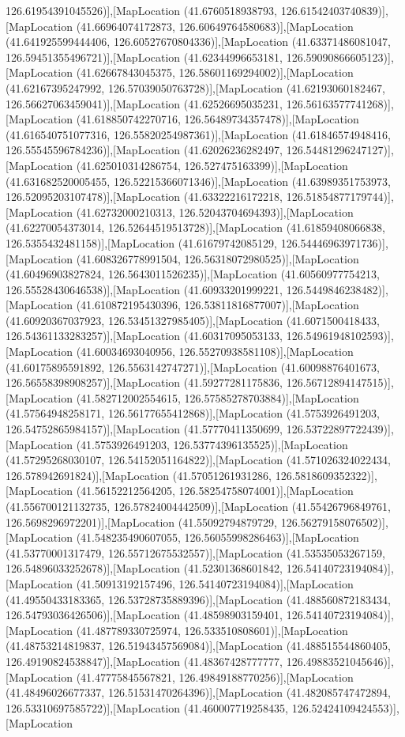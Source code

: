 126.61954391045526)],[MapLocation (41.6760518938793, 126.61542403740839)],[MapLocation (41.66964074172873, 126.60649764580683)],[MapLocation (41.641925599444406, 126.60527670804336)],[MapLocation (41.63371486081047, 126.59451355496721)],[MapLocation (41.62344996653181, 126.59090866605123)],[MapLocation (41.62667843045375, 126.58601169294002)],[MapLocation (41.62167395247992, 126.57039050763728)],[MapLocation (41.62193060182467, 126.56627063459041)],[MapLocation (41.62526695035231, 126.56163577741268)],[MapLocation (41.618850742270716, 126.56489734357478)],[MapLocation (41.616540751077316, 126.55820254987361)],[MapLocation (41.61846574948416, 126.55545596784236)],[MapLocation (41.62026236282497, 126.54481296247127)],[MapLocation (41.625010314286754, 126.527475163399)],[MapLocation (41.631682520005455, 126.52215366071346)],[MapLocation (41.63989351753973, 126.52095203107478)],[MapLocation (41.63322216172218, 126.51854877179744)],[MapLocation (41.62732000210313, 126.52043704694393)],[MapLocation (41.62270054373014, 126.52644519513728)],[MapLocation (41.61859408066838, 126.5355432481158)],[MapLocation (41.61679742085129, 126.54446963971736)],[MapLocation (41.608326778991504, 126.56318072980525)],[MapLocation (41.60496903827824, 126.5643011526235)],[MapLocation (41.60560977754213, 126.55528430646538)],[MapLocation (41.60933201999221, 126.5449846238482)],[MapLocation (41.610872195430396, 126.53811816877007)],[MapLocation (41.60920367037923, 126.53451327985405)],[MapLocation (41.6071500418433, 126.54361133283257)],[MapLocation (41.60317095053133, 126.54961948102593)],[MapLocation (41.60034693040956, 126.55270938581108)],[MapLocation (41.60175895591892, 126.5563142747271)],[MapLocation (41.60098876401673, 126.56558398908257)],[MapLocation (41.59277281175836, 126.56712894147515)],[MapLocation (41.582712002554615, 126.57585278703884)],[MapLocation (41.57564948258171, 126.56177655412868)],[MapLocation (41.5753926491203, 126.54752865984157)],[MapLocation (41.57770411350699, 126.53722897722439)],[MapLocation (41.5753926491203, 126.53774396135525)],[MapLocation (41.57295268030107, 126.54152051164822)],[MapLocation (41.571026324022434, 126.578942691824)],[MapLocation (41.57051261931286, 126.5818609352322)],[MapLocation (41.56152212564205, 126.58254758074001)],[MapLocation (41.556700121132735, 126.57824004442509)],[MapLocation (41.55426796849761, 126.5698296972201)],[MapLocation (41.55092794879729, 126.56279158076502)],[MapLocation (41.548235490607055, 126.56055998286463)],[MapLocation (41.53770001317479, 126.55712675532557)],[MapLocation (41.53535053267159, 126.54896033252678)],[MapLocation (41.52301368601842, 126.54140723194084)],[MapLocation (41.50913192157496, 126.54140723194084)],[MapLocation (41.49550433183365, 126.53728735889396)],[MapLocation (41.488560872183434, 126.54793036426506)],[MapLocation (41.48598903159401, 126.54140723194084)],[MapLocation (41.487789330725974, 126.533510808601)],[MapLocation (41.48753214819837, 126.51943457569084)],[MapLocation (41.488515544860405, 126.49190824538847)],[MapLocation (41.48367428777777, 126.49883521045646)],[MapLocation (41.47775845567821, 126.49849188770256)],[MapLocation (41.48496026677337, 126.51531470264396)],[MapLocation (41.482085747472894, 126.53310697585722)],[MapLocation (41.460007719258435, 126.52424109424553)],[MapLocation 